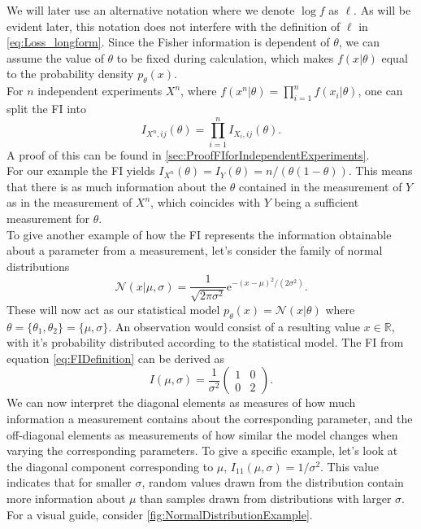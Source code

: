 We will later use an alternative notation where we denote $\log f$ as $\ell$. As will be evident later, this notation does not interfere with the definition of $\ell$ in \cref{eq:Loss_longform}. Since the Fisher information is dependent of $\theta$, we can assume the value of $\theta$ to be fixed during calculation, which makes $f(x|\theta)$ equal to the probability density $p_\theta(x)$.\\ 
For $n$ independent experiments $X^n$, where $f(x^n|\theta) = \prod_{i=1}^n f(x_i|\theta)$, one can split the FI into 
\begin{equation}\label{eq:FIforIndependentExperiments}
	I_{X^n,ij}(\theta) = \prod_{i=1}^n I_{X_i,ij}(\theta).
\end{equation}
A proof of this can be found in \cref{sec:ProofFIforIndependentExperiments}.\\
For our example the FI yields $I_{X^n}(\theta) = I_{Y}(\theta) = n/(\theta(1-\theta))$\cite{StatisticFisherInfoTutorial}. This means that there is as much information about the $\theta$ contained in the measurement of $Y$ as in the measurement of $X^n$, which coincides with $Y$ being a sufficient measurement for $\theta$. \\
To give another example of how the FI represents the information obtainable about a parameter from a measurement, let's consider the family of normal distributions
\begin{equation}
	\mathcal{N}(x|\mu,\sigma) = \frac{1}{\sqrt{2\pi\sigma^2}}\mathrm{e}^{-(x-\mu)^2/(2\sigma^2)}.
\end{equation} 
These will now act as our statistical model $p_\theta(x) = \mathcal{N}(x|\theta)$ where $\theta = \{\theta_1,\theta_2\} = \{\mu, \sigma\}$. An observation would consist of a resulting value $x\in \mathbb{R}$, with it's probability distributed according to the statistical model. The FI from equation \cref{eq:FIDefinition} can be derived as 
\begin{equation}
	I(\mu,\sigma) = \frac{1}{\sigma^2}
	\begin{pmatrix}
		1 & 0 \\
		0 & 2
	\end{pmatrix}.
\end{equation}
We can now interpret the diagonal elements as measures of how much information a measurement contains about the corresponding parameter, and the off-diagonal elements as measurements of how similar the model changes when varying the corresponding parameters. To give a specific example, let's look at the diagonal component corresponding to $\mu$, $I_{11}(\mu,\sigma) = 1/\sigma^2$. This value indicates that for smaller $\sigma$, random values drawn from the distribution contain more information about $\mu$ than samples drawn from distributions with larger $\sigma$. For a visual guide, consider \cref{fig:NormalDistributionExample}.
